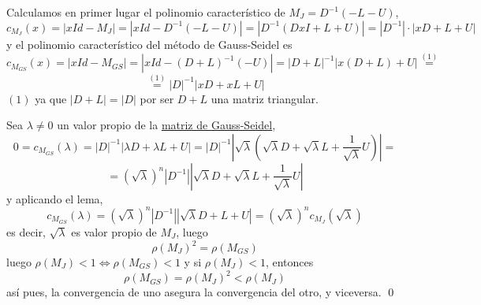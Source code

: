     \begin{dem}

        Calculamos en primer lugar el polinomio característico de $M_J=D^{-1}(-L-U)$, 
        $$c_{M_J}(x)=|xId-M_J|=|xId-D^{-1}(-L-U)|=|D^{-1}(DxI+L+U)|=|D^{-1}| \cdot |xD+L+U|$$
        y el polinomio característico del método de Gauss-Seidel es
        $$c_{M_{GS}}(x)=|xId-M_{GS}|=|xId-(D+L)^{-1}(-U)|=|D+L|^{-1} |x(D+L)+U|\overset{(1)}{=}$$
        $$\overset{(1)}{=}|D|^{-1} |xD+xL+U|$$
        $(1)$ ya que $|D+L|=|D|$ por ser $D+L$ una matriz triangular.
        
        Sea $\lambda \neq 0 $ un valor propio de la \underline{matriz de Gauss-Seidel},
        $$0=c_{M_{GS}}(\lambda)=|D|^{-1} |\lambda D+\lambda L+U|=|D|^{-1} \left|\sqrt{\lambda}\left(\sqrt{\lambda} D+\sqrt{\lambda}L +\frac{1}{\sqrt{\lambda}}U \right)\right|=$$
        $$=\left(\sqrt{\lambda}\right)^n|D^{-1}|  \left|\sqrt{\lambda} D+\sqrt{\lambda}L +\frac{1}{\sqrt{\lambda}}U\right| $$
        y aplicando el lema, 
        $$c_{M_{GS}}(\lambda)=\left(\sqrt{\lambda}\right)^n |D^{-1}|  \left|\sqrt{\lambda} D+L +U \right|=\left(\sqrt{\lambda}\right)^n c_{M_{J}}(\sqrt{\lambda})$$
        es decir, $\sqrt{\lambda}$ es valor propio de $M_J$, luego
        $$\rho(M_{J})^2=\rho(M_{GS})$$
        luego $\rho(M_J)<1 \iff \rho(M_{GS})<1$ y si $\rho(M_J) < 1$, entonces
        $$\rho(M_{GS})=\rho(M_{J})^2 < \rho(M_J)$$
        así pues, la convergencia de uno asegura la convergencia del otro, y viceversa.
    \qed\end{dem}
